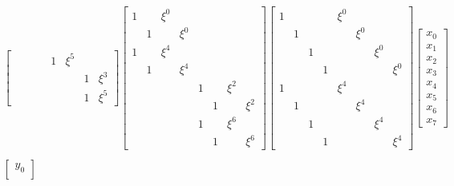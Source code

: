 \documentclass{jsarticle}
\begin{document}
\begin{align*}
\begin{bmatrix}
      &       &   &       & 1 & \xi^5 &   &       \\
      &       &   &       &   &       & 1 & \xi^3 \\
      &       &   &       &   &       & 1 & \xi^5
  \end{bmatrix}
  \begin{bmatrix}
    1 &   & \xi^0 &       &   &   &       &       \\
      & 1 &       & \xi^0 &   &   &       &       \\
    1 &   & \xi^4 &       &   &   &       &       \\
      & 1 &       & \xi^4 &   &   &       &       \\
      &   &       &       & 1 &   & \xi^2 &       \\
      &   &       &       &   & 1 &       & \xi^2 \\
      &   &       &       & 1 &   & \xi^6 &       \\
      &   &       &       &   & 1 &       & \xi^6
  \end{bmatrix}
  \begin{bmatrix}
    1 &   &   &   & \xi^0 &       &       &       \\
      & 1 &   &   &       & \xi^0 &       &       \\
      &   & 1 &   &       &       & \xi^0 &       \\
      &   &   & 1 &       &       &       & \xi^0 \\
    1 &   &   &   & \xi^4 &       &       &       \\
      & 1 &   &   &       & \xi^4 &       &       \\
      &   & 1 &   &       &       & \xi^4 &       \\
      &   &   & 1 &       &       &       & \xi^4
  \end{bmatrix}
  \begin{bmatrix}
    x_0 \\
    x_1 \\
    x_2 \\
    x_3 \\
    x_4 \\
    x_5 \\
    x_6 \\
    x_7
  \end{bmatrix}
  \tag{2}
  \\
  \\
  \begin{bmatrix}
    y_0 \\

\end{bmatrix}
\end{align*}
\end{document}

